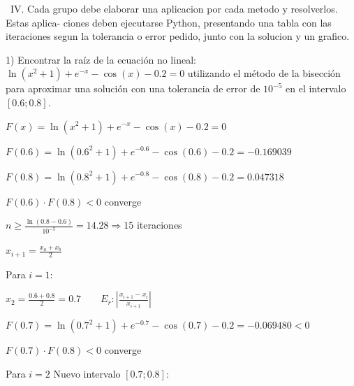 \documentclass[12pt]{article}
\begin{document}
\ IV. Cada grupo debe elaborar una aplicacion por cada metodo y resolverlos. Estas aplica-
ciones deben ejecutarse Python, presentando una tabla con las iteraciones segun la tolerancia
o error pedido, junto con la solucion y un grafico.

1) Encontrar la raíz de la ecuación no lineal: $\ln(x^2+1)+e^{-x}-\cos(x)-0.2=0$ utilizando el método de la bisección para aproximar una solución con una tolerancia de error de $10^{-5}$ en el intervalo $[0.6; 0.8]$.

\begin{center}
\end{center}

$F(x)=\ln(x^2+1)+e^{-x}-\cos(x)-0.2=0$

$F(0.6)=\ln(0.6^2+1)+e^{-0.6}-\cos(0.6)-0.2=-0.169039$

$F(0.8)=\ln(0.8^2+1)+e^{-0.8}-\cos(0.8)-0.2=0.047318$

$F(0.6)\cdot F(0.8)<0$ converge

$n\geq\frac{\ln(0.8-0.6)}{10^{-5}}=14.28 \Rightarrow 15$ iteraciones

$x_{i+1}=\frac{x_a+x_b}{2}$

\vspace{0.5cm}
Para $i=1$:

$x_2=\frac{0.6+0.8}{2}=0.7 \qquad E_r:\left|\frac{x_{i+1}-x_i}{x_{i+1}}\right|$

$F(0.7)=\ln(0.7^2+1)+e^{-0.7}-\cos(0.7)-0.2=-0.069480<0$

$F(0.7)\cdot F(0.8)<0$ converge

\vspace{0.5cm}
Para $i=2$ Nuevo intervalo $[0.7;0.8]$:
\end{document}
